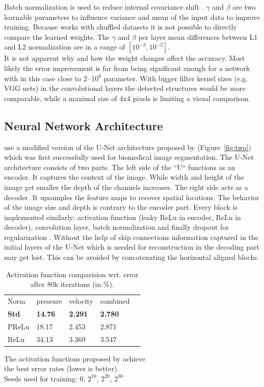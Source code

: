 \documentclass[acmtog]{techreportacmart}
\begin{document}
Batch normalization is used to reduce internal covariance shift \cite{ioffe2015}. 
$\gamma$ and $\beta$ are two learnable parameters to influence variance and mean of the input data to improve training. Because \cite{Thuerey20} works with shuffled datasets it is not possible to directly compare the learned weights. The $\gamma$ and $\beta$ per layer mean differences between L1 and L2 normalization are in a range of $[10^{-3}, 10^{-2}]$. \\ 
It is not apparent why and how the weight changes affect the accuracy. Most likely the error improvement is far from being significant enough for a network with in this case close to $2 \cdot 10^{6}$ parameter. With bigger filter kernel sizes (e.g. VGG nets) in the convolutional layers the detected structures would be more comparable, while a maximal size of 4x4 pixels is limiting a visual comparison.

\subsection{Neural Network Architecture}
\cite{Thuerey20} use a modified version of the U-Net architecture proposed by \cite{ronneberger2015} (Figure~\ref{fig:two}) which was first successfully used for biomedical image segmentation.
The U-Net architecture consists of two parts. The left side of the ``U`` functions as an encoder. It captures the context of the image. While width and height of the image get smaller the depth of the channels increases. The right side acts as a decoder. It upsamples the feature maps to recover spatial locations. The behavior of the image size and depth is contrary to the encoder part. Every block is implemented similarly: activation function (leaky ReLu in encoder, ReLu in decoder), convolution layer, batch normalization and finally dropout for regularization \cite{Thuerey20}. Without the help of skip connections information captured in the initial layers of the U-Net which is needed for reconstruction in the decoding part may get lost. This can be avoided by concatenating the horizontal aligned blocks.

\begin{table}[h]
\caption{Activation function comparision wrt. error \\ after 80k iterations (in \%).}
\label{tab:two}
\begin{center}
\begin{tabular}{l|l|l|l|l}
  \toprule
  Norm   & pressure   &	velocity    & combined \\
  \bf Std	 & \bf 14.76	  & \bf 2.291		& \bf 2.780	   \\
  PReLu	 & 18.17	  & 2.453		& 2.871	   \\
  ReLu	 & 34.13	  & 3.369		& 3.547	   \\
  \bottomrule
\end{tabular}
\end{center}
\bigskip\centering
\footnotesize The activation functions proposed by \cite{Thuerey20} achieve \\ 
the best error rates (lower is better). \\
Seeds used for training: $0$, $2^{10}$, $2^{20}$, $2^{30}$

\end{table}%
\end{document}

